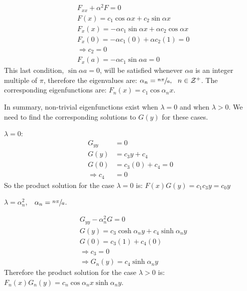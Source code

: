 \begin{align*}
&F_{xx}+\alpha^2 F = 0 \\
&F(x) = c_1 \cos{\alpha x} + c_2 \sin{\alpha x} \\
&F_{x}(x) = -\alpha c_1 \sin{\alpha x} + \alpha c_2 \cos{\alpha x} \\
&F_{x}(0) = -\alpha c_1 (0) + \alpha c_2 (1) = 0 \\
&\Rightarrow c_2 = 0 \\
&F_{x}(a) = -\alpha c_1 \sin{\alpha a} = 0
\end{align*}
This last condition, $\sin{\alpha a} = 0$, will be satisfied whenever $\alpha a$ is an integer multiple of $\pi$, therefore the eigenvalues are: $\alpha_n = \sfrac{n \pi}{a}, \ \ n\in \mathcal{Z}^+$.  The corresponding eigenfunctions are: $F_n(x) = c_1 \cos{\alpha_n x}$.

\vspace{0.25cm}

\noindent In summary, non-trivial eigenfunctions exist when $\lambda = 0$ and when $\lambda >0$.  We need to find the corresponding solutions to $G(y)$ for these cases.

\vspace{0.1cm}

\noindent\underline{$\lambda = 0$}: 
\begin{align*}
G_{yy} &= 0 \\
G(y) &= c_3y + c_4 \\
G(0) &= c_3(0) + c_4 = 0 \\
\Rightarrow c_4 &= 0
\end{align*} 
So the product solution for the case $\lambda = 0$ is: $F(x)G(y) = c_1 c_3y = c_0y$

\vspace{0.25cm}

\noindent\underline{$\lambda = \alpha_n^2$}, $\ \ \alpha_n = \sfrac{n \pi}{a}$.

\begin{align*}
&G_{yy} - \alpha_n^2 G = 0 \\
&G(y) = c_3 \cosh{\alpha_n y} + c_4 \sinh{\alpha_n y} \\
&G(0) = c_3 (1) + c_4(0) \\
&\Rightarrow c_3 = 0 \\
&\Rightarrow G_n(y) = c_4 \sinh{\alpha_n y}
\end{align*}
Therefore the product solution for the case $\lambda > 0$ is: $F_n(x)G_n(y) = c_n \cos{\alpha_n x} \sinh{\alpha_n y}$.

